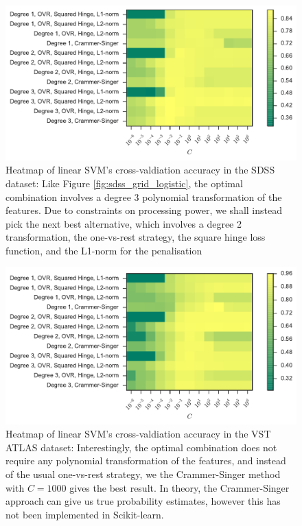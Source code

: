 \begin{figure}[p]
	\centering
	\includegraphics[width=\textwidth]{figures/4_expt1/sdss_grid_poly}
	\caption[Heatmap of linear SVM's cross-valdiation accuracy in SDSS]{
		Heatmap of linear SVM's cross-valdiation accuracy in the SDSS dataset:
		Like Figure \ref{fig:sdss_grid_logistic}, the optimal
		combination involves a degree 3 polynomial transformation of the features.
		Due to constraints on
		processing power, we shall instead pick the next best alternative, which involves
		a degree 2 transformation, the one-vs-rest strategy, the square hinge loss function,
		and the L1-norm for the penalisation}
	\label{fig:sdss_grid_poly}
\end{figure}

\begin{figure}[p]
	\centering
	\includegraphics[width=\textwidth]{figures/4_expt1/vstatlas_grid_poly}
	\caption[Heatmap of linear SVM's cross-valdiation accuracy in VST ATLAS]{
		Heatmap of linear SVM's cross-valdiation accuracy in the VST ATLAS dataset:
		Interestingly, the optimal combination does not require any polynomial
		transformation of the features, and instead of the usual one-vs-rest strategy,
		we the Crammer-Singer method
		with $C = 1000$ gives the best result. In theory, the Crammer-Singer approach
		can give us true probability estimates, however this has not been implemented
		in Scikit-learn.}
	\label{fig:vstatlas_grid_poly}
\end{figure}

